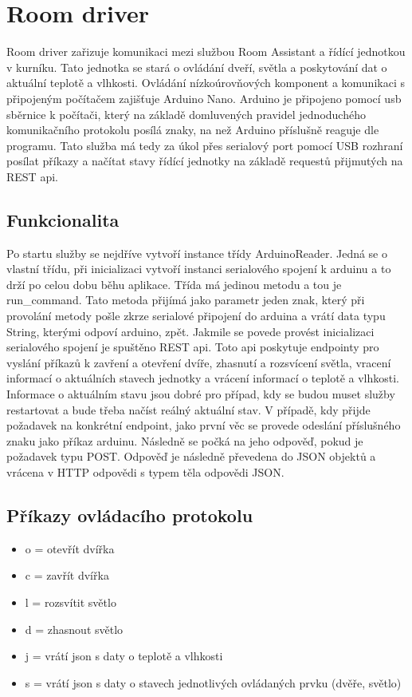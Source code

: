 \section{Room driver}\label{sec:room-driver}
Room driver zařizuje komunikaci mezi službou Room Assistant a řídící jednotkou v kurníku.
Tato jednotka se stará o ovládání dveří, světla a poskytování dat o aktuální teplotě a vlhkosti.
Ovládání nízkoúrovňových komponent a komunikaci s připojeným počítačem zajišťuje Arduino Nano.
Arduino je připojeno pomocí usb sběrnice k počítači, který na základě domluvených pravidel jednoduchého komunikačního protokolu posílá znaky, na než Arduino příslušně reaguje dle programu.
Tato služba má tedy za úkol přes serialový port pomocí USB rozhraní posílat příkazy a načítat stavy řídící jednotky na základě requestů přijmutých na REST api.

\subsection*{Funkcionalita}
Po startu služby se nejdříve vytvoří instance třídy ArduinoReader.
Jedná se o vlastní třídu, při inicializaci vytvoří instanci serialového spojení k arduinu a to drží po celou dobu běhu aplikace.
Třída má jedinou metodu a tou je run\_command.
Tato metoda přijímá jako parametr jeden znak, který při provolání metody pošle zkrze serialové připojení do arduina a vrátí data typu String, kterými odpoví arduino, zpět.
Jakmile se povede provést inicializaci serialového spojení je spuštěno REST api.
Toto api poskytuje endpointy pro vyslání příkazů k zavření a otevření dvíře, zhasnutí a rozsvícení světla, vracení informací o aktuálních stavech jednotky a vrácení informací o teplotě a vlhkosti.
Informace o aktuálním stavu jsou dobré pro případ, kdy se budou muset služby restartovat a bude třeba načíst reálný aktuální stav.
V případě, kdy přijde požadavek na konkrétní endpoint, jako první věc se provede odeslání příslušného znaku jako příkaz arduinu.
Následně se počká na jeho odpověď, pokud je požadavek typu POST.
Odpověď je následně převedena do JSON objektů a vrácena v HTTP odpovědi s typem těla odpovědi JSON.

\subsection*{Příkazy ovládacího protokolu}
\begin{itemize}
    \item o = otevřít dvířka
    \item c = zavřít dvířka
    \item l = rozsvítit světlo
    \item d = zhasnout světlo
    \item j = vrátí json s daty o teplotě a vlhkosti
    \item s = vrátí json s daty o stavech jednotlivých ovládaných prvku (dvěře, světlo)
\end{itemize}

